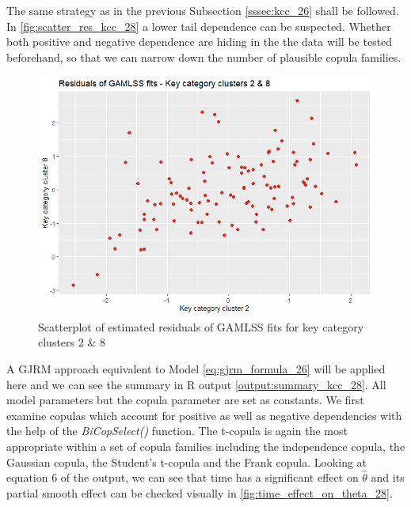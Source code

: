 
The same strategy as in the previous Subsection \ref{sssec:kcc_26} shall be followed. In \autoref{fig:scatter_res_kcc_28} a lower tail dependence can be suspected. Whether both positive and negative dependence are hiding in the the data will be tested beforehand, so that we can narrow down the number of plausible copula families.
\\

\begin{figure}[H]
\centering
  \includegraphics[width=0.45\linewidth]{figures/scatter_res_kcc_28.png}
  \caption{Scatterplot of estimated residuals of GAMLSS fits for key category clusters 2 \& 8}
  \label{fig:scatter_res_kcc_28}
\end{figure}


A \ac{GJRM} approach equivalent to Model \ref{eq:gjrm_formula_26} will be applied here and we can see the summary in R output \ref{output:summary_kcc_28}. All model parameters but the copula parameter are set as constants. We first examine copulas which account for positive as well as negative dependencies with the help of the \textit{BiCopSelect()} function. The t-copula is again the most appropriate within a set of copula families including the independence copula, the Gaussian copula, the Student's t-copula and the Frank copula. Looking at equation 6 of the output, we can see that time has a significant effect on $\hat{\theta}$ and its partial smooth effect can be checked visually in \autoref{fig:time_effect_on_theta_28}.
\\








